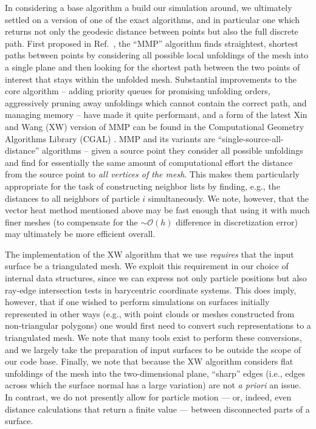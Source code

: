 \documentclass[preprint,12pt]{elsarticle}
\begin{document}
In considering a base algorithm a build our simulation around, we ultimately settled on a version of one of the exact algorithms, and in particular one which returns not only the geodesic distance between points but also the full discrete path. First proposed in Ref.~\cite{mitchell1987discrete}, the ``MMP'' algorithm  finds straightest, shortest paths between points by considering all possible local unfoldings of the mesh into a single plane and then looking for the shortest path between the two points of interest that stays within the unfolded mesh. Substantial improvements to the core algorithm -- adding priority queues for promising unfolding orders, aggressively pruning away unfoldings which cannot contain the correct path, and managing memory \cite{chen1990shortest, surazhsky2005fast} -- have made it quite performant, and a form of the latest Xin and Wang (XW) \cite{xin2009improving} version of MMP can be found in the Computational Geometry Algorithms Library (CGAL) \cite{cgaleb23b}. MMP and its variants are ``single-source-all-distance'' algorithms -- given a source point they consider all possible unfoldings and find for essentially the same amount of computational effort the distance from the source point to \emph{all vertices of the mesh}. This makes them particularly appropriate for the task of constructing neighbor lists by finding, e.g., the distances to all neighbors of particle $i$ simultaneously. We note, however, that the vector heat method mentioned above may be fast enough that using it with much finer meshes (to compensate for the $\sim\mathcal{O}(h)$ difference in discretization error) may ultimately be more efficient overall.

The implementation of the XW algorithm that we use \emph{requires} that the input surface be a triangulated mesh. We exploit this requirement in our choice of internal data structures, since we can express not only particle positions but also ray-edge intersection tests in barycentric coordinate systems. 
This does imply, however, that if one wished to perform simulations on surfaces initially represented in other ways (e.g., with point clouds or meshes constructed from non-triangular polygons) one would first need to convert such representations to a triangulated mesh. We note that many tools exist to perform these conversions, and we largely take the preparation of input surfaces to be outside the scope of our code base.
Finally, we note that because the XW algorithm considers flat unfoldings of the mesh into the two-dimensional plane, ``sharp'' edges (i.e., edges across which the surface normal has a large variation) are not \emph{a priori} an issue. 
In contrast, we do not presently allow for particle motion --- or, indeed, even distance calculations that return a finite value --- between disconnected parts of a surface.
\end{document}

